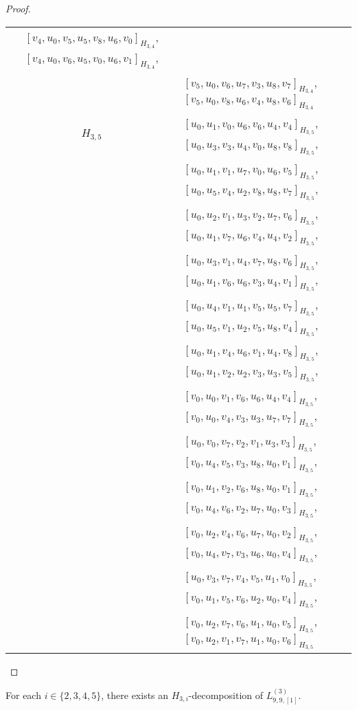 \begin{subappendices}
\begin{proof}
{\begin{longtable}{|c|l|}
  $[v_4, u_0, v_5, u_5, v_8, u_6, v_0]_{H_{3,4}}$,
  $[v_4, u_0, v_6, u_5, v_0, u_6, v_1]_{H_{3,4}}$, \\* &
  $[v_5, u_0, v_6, u_7, v_3, u_8, v_7]_{H_{3,4}}$,
  $[v_5, u_0, v_8, u_6, v_4, u_8, v_6]_{H_{3,4}}$
\\ \hline
$H_{3,5}$ &
  $[u_0, u_1, v_0, u_6, v_6, u_4, v_4]_{H_{3,5}}$,
  $[u_0, u_3, v_3, u_4, v_0, u_8, v_8]_{H_{3,5}}$, \\* &
  $[u_0, u_1, v_1, u_7, v_0, u_6, v_5]_{H_{3,5}}$,
  $[u_0, u_5, v_4, u_2, v_8, u_8, v_7]_{H_{3,5}}$, \\* &
  $[u_0, u_2, v_1, u_3, v_2, u_7, v_6]_{H_{3,5}}$,
  $[u_0, u_1, v_7, u_6, v_4, u_4, v_2]_{H_{3,5}}$, \\* &
  $[u_0, u_3, v_1, u_4, v_7, u_8, v_6]_{H_{3,5}}$,
  $[u_0, u_1, v_6, u_6, v_3, u_4, v_1]_{H_{3,5}}$, \\* &
  $[u_0, u_4, v_1, u_1, v_5, u_5, v_7]_{H_{3,5}}$,
  $[u_0, u_5, v_1, u_2, v_5, u_8, v_4]_{H_{3,5}}$, \\* &
  $[u_0, u_1, v_4, u_6, v_1, u_4, v_8]_{H_{3,5}}$,
  $[u_0, u_1, v_2, u_2, v_3, u_3, v_5]_{H_{3,5}}$, \\* &
  $[v_0, u_0, v_1, v_6, u_6, u_4, v_4]_{H_{3,5}}$,
  $[v_0, u_0, v_4, v_3, u_3, u_7, v_7]_{H_{3,5}}$, \\* &
  $[u_0, v_0, v_7, v_2, v_1, u_3, v_3]_{H_{3,5}}$,
  $[v_0, u_4, v_5, v_3, u_8, u_0, v_1]_{H_{3,5}}$, \\* &
  $[v_0, u_1, v_2, v_6, u_8, u_0, v_1]_{H_{3,5}}$,
  $[v_0, u_4, v_6, v_2, u_7, u_0, v_3]_{H_{3,5}}$, \\* &
  $[v_0, u_2, v_4, v_6, u_7, u_0, v_2]_{H_{3,5}}$,
  $[v_0, u_4, v_7, v_3, u_6, u_0, v_4]_{H_{3,5}}$, \\* &
  $[u_0, v_3, v_7, v_4, v_5, u_1, v_0]_{H_{3,5}}$,
  $[v_0, u_1, v_5, v_6, u_2, u_0, v_4]_{H_{3,5}}$, \\* &
  $[v_0, u_2, v_7, v_6, u_1, u_0, v_5]_{H_{3,5}}$,
  $[v_0, u_2, v_1, v_7, u_1, u_0, v_6]_{H_{3,5}}$
\\ \hline
\end{longtable}
}
\end{proof}


\begin{example} \label{eg:H_3i-l99-k991}
For each $i \in \{2,3,4,5\}$, there exists an $H_{3,i}$-decomposition of $L_{9,9,[1]}^{(3)}$.
\end{example}


\end{subappendices}
